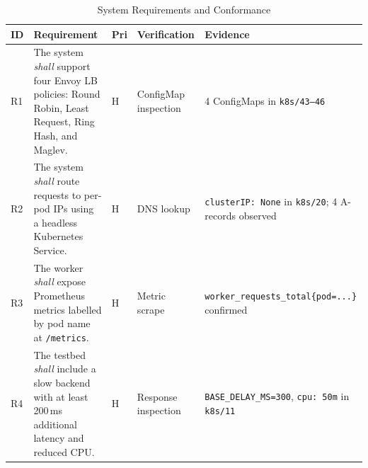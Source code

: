 \documentclass[conference]{IEEEtran}
\begin{document}
\begin{table}[t]
  \centering
  \caption{System Requirements and Conformance}
  \label{tab:requirements}
  \begin{tabular}{p{0.5cm}p{5.5cm}p{0.7cm}p{2.5cm}p{4.0cm}}
    \toprule
    ID                                                      & Requirement                                                              & Pri & Verification & Evidence \\
    \midrule
    R1                                                      & The system \textit{shall} support four Envoy LB policies: Round Robin,
    Least Request, Ring Hash, and Maglev.                   & H                                                                        &
    ConfigMap inspection                                    &
    4 ConfigMaps in \texttt{k8s/43--46}                                                                                                                                \\
    R2                                                      & The system \textit{shall} route requests to per-pod IPs using a headless
    Kubernetes Service.                                     & H                                                                        &
    DNS lookup                                              &
    \texttt{clusterIP: None} in \texttt{k8s/20}; 4 A-records observed                                                                                                  \\
    R3                                                      & The worker \textit{shall} expose Prometheus metrics labelled by pod name
    at \texttt{/metrics}.                                   & H                                                                        &
    Metric scrape                                           &
    \texttt{worker\_requests\_total\{pod=...\}} confirmed                                                                                                              \\
    R4                                                      & The testbed \textit{shall} include a slow backend with at least 200\,ms
    additional latency and reduced CPU.                     & H                                                                        &
    Response inspection                                     &
    \texttt{BASE\_DELAY\_MS=300}, \texttt{cpu: 50m} in \texttt{k8s/11}                                                                                                 \\

\end{tabular}
\end{table}
\end{document}
